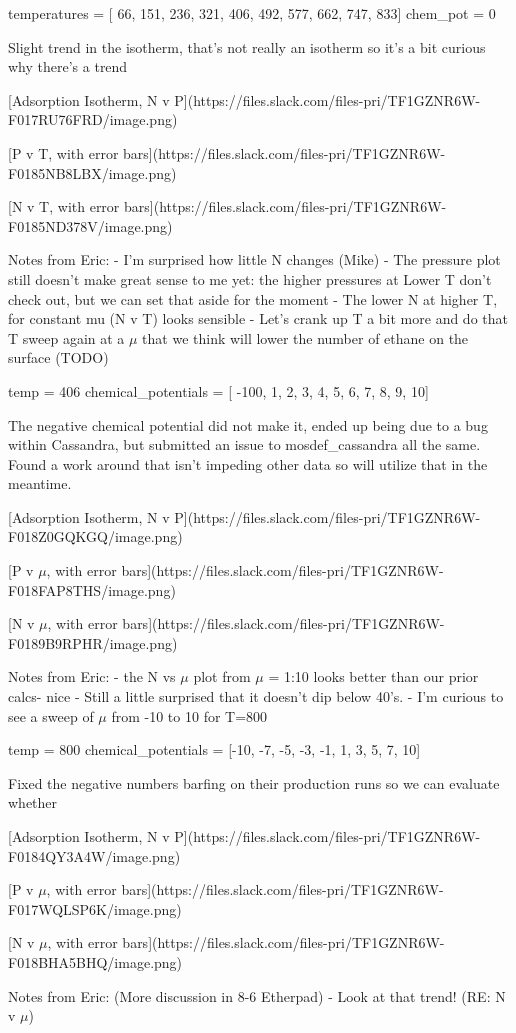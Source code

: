 temperatures = [ 66, 151, 236, 321, 406, 492, 577, 662, 747, 833]
chem_pot = 0

Slight trend in the isotherm, that's not really an isotherm so it's a bit curious why there's a trend

[Adsorption Isotherm, N v P](https://files.slack.com/files-pri/TF1GZNR6W-F017RU76FRD/image.png)

[P v T, with error bars](https://files.slack.com/files-pri/TF1GZNR6W-F0185NB8LBX/image.png)

[N v T, with error bars](https://files.slack.com/files-pri/TF1GZNR6W-F0185ND378V/image.png)

Notes from Eric:
 - I'm surprised how little N changes (Mike)
 - The pressure plot still doesn't make great sense to me yet: the higher pressures at Lower T don't check out, but we can set that aside for the moment
 - The lower N at higher T, for constant mu (N v T) looks sensible
 - Let's crank up T a bit more and do that T sweep again at a $\mu$ that we think will lower the number of ethane on the surface (TODO) 

temp = 406
chemical_potentials = [ -100, 1,  2,  3,  4,  5,  6,  7,  8,  9, 10]

The negative chemical potential did not make it, ended up being due to a bug within Cassandra, but submitted an issue to mosdef_cassandra all the same. Found a work around that isn't impeding other data so will utilize that in the meantime. 

[Adsorption Isotherm, N v P](https://files.slack.com/files-pri/TF1GZNR6W-F018Z0GQKGQ/image.png)

[P v $\mu$, with error bars](https://files.slack.com/files-pri/TF1GZNR6W-F018FAP8THS/image.png)

[N v $\mu$, with error bars](https://files.slack.com/files-pri/TF1GZNR6W-F0189B9RPHR/image.png)

Notes from Eric:
 - the N vs $\mu$ plot from $\mu$ = 1:10 looks better than our prior calcs- nice
 - Still a little surprised that it doesn't dip below 40's.
 - I'm curious to see a sweep of $\mu$ from -10 to 10 for T=800

temp = 800
chemical_potentials = [-10,  -7,  -5,  -3,  -1,   1,   3,   5,   7,  10] 

Fixed the negative numbers barfing on their production runs so we can evaluate whether 

[Adsorption Isotherm, N v P](https://files.slack.com/files-pri/TF1GZNR6W-F0184QY3A4W/image.png)

[P v $\mu$, with error bars](https://files.slack.com/files-pri/TF1GZNR6W-F017WQLSP6K/image.png)

[N v $\mu$, with error bars](https://files.slack.com/files-pri/TF1GZNR6W-F018BHA5BHQ/image.png)

Notes from Eric: (More discussion in 8-6 Etherpad)
 - Look at that trend! (RE: N v $\mu$)
